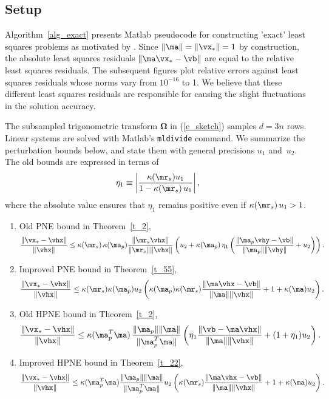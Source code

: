 \documentclass[final]{siamart220329}%
\begin{document}
\subsection{Setup}\label{s_expsetup2}
Algorithm~\ref{alg_exact} presents Matlab pseudocode for 
constructing 'exact' least squares problems as motivated by \cite[Section 1.5]{MNTW24}. 
Since $\|\ma\|=\|\vx_*\|=1$ by construction, the absolute least squares residuals $\|\ma\vx_*-\vb\|$ are equal to the relative least squares residuals. 
The subsequent figures plot relative errors against least squares residuals whose norms vary from $10^{-16}$ to 1. 
We believe that these different least squares residuals are responsible for causing the slight fluctuations in the solution accuracy. 

The subsampled trigonometric transform $\mathbf{\Omega}$
in  (\ref{e_sketch}) samples $d=3n$ rows. 
Linear systems are solved with Matlab's \verb|mldivide| command.
We summarize the perturbation bounds below, and state them with general precisions $u_1$ and~$u_2$.
The old bounds are expressed in terms of
\begin{align*}
\eta_1 \equiv \left|\frac{\kappa(\mr_s)u_1}{1-\kappa(\mr_s)\,u_1}\right|,
\end{align*}
where the absolute value ensures that $\eta_1$ remains positive 
even if $\kappa(\mr_s)\,u_1>1$.



\begin{enumerate}
\item Old PNE bound in Theorem~\ref{t_2},
\begin{align}
     \frac{\|\vx_*-\vhx\|}{\|\vhx\|} \leq \kappa(\mr_s)\,\kappa(\ma_p)\frac{\|\mr_s\vhx\|}{\|\mr_s\| \|\vhx\|}
\left(u_2+\kappa(\ma_p)\, \eta_1
\left(\frac{\|\ma_p\vhy-\vb\|}{\|\ma_p\|\|\vhy\|}+u_2\right)\right). \label{eq31}
\end{align}
\item Improved PNE bound in Theorem~\ref{t_55}, 
\begin{align}
     \frac{\|\vx_*-\vhx\|}{\|\vhx\|} \leq \kappa(\mr_s)\kappa(\ma_p)u_2\left(\kappa(\ma_p)\kappa(\mr_s)\frac{\|\ma\vhx-\vb\|}{\|\ma\|\|\vhx\|}+ 1+\kappa(\ma)u_2 \right). \label{eq41}
\end{align}
\item Old HPNE bound in Theorem~\ref{t_2},
\begin{align}
     \frac{\|\vx_*-\vhx\|}{\|\vhx\|} \leq \kappa(\ma_p^T\ma)\, \frac{\|\ma_p\|\|\ma\|}{\|\ma_p^T\ma\|} 
\left(\eta_1\frac{\|\vb-\ma\vhx\|}{\|\ma\|\|\vhx\|}+(1+\eta_1)u_2\right). \label{eq42}
\end{align}
\item Improved HPNE bound in Theorem~\ref{t_22},
\begin{align}
 \frac{\|\vx_*-\vhx\|}{\|\vhx\|} \leq \kappa(\ma_p^T\ma)\frac{\|\ma_p\|\|\ma\|}{\|\ma_p^T\ma\|}  u_2\left(\kappa(\mr_s)\frac{\|\ma\vhx-\vb\|}{\|\ma\|\|\vhx\|}+1+\kappa(\ma)u_2\right).\label{eq32}
\end{align}
\end{enumerate}
\end{document}
